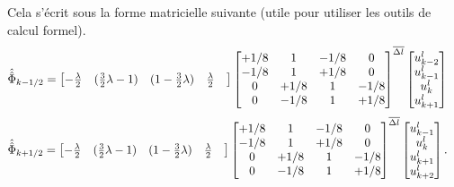             Cela s'écrit sous la forme matricielle suivante (utile pour utiliser les outils de calcul formel).
            \begin{align}
                \hat{\hat{\Phi}}_{k-1/2}
                    &=
                \begin{bmatrix}
                    -\frac{\lambda}{2}&
                    (\frac{3}{2} \lambda - 1)&
                    (1 - \frac{3}{2} \lambda)&
                    \frac{\lambda}{2}&
                \end{bmatrix}
                \begin{bmatrix}
                    +1/8 & 1 & -1/8 & 0\\
                    -1/8 & 1 & +1/8 & 0\\
                    0 & +1/8 & 1 & -1/8\\
                    0 & -1/8 & 1 & +1/8\\
                \end{bmatrix}^{\overline{\Delta l}}
                \begin{bmatrix}
                    u^l_{k-2}\\
                    u^l_{k-1}\\
                    u^l_{k}\\
                    u^l_{k+1}\\
                \end{bmatrix}
            \end{align}
            \begin{align}
                \hat{\hat{\Phi}}_{k+1/2}
                    &=
                \begin{bmatrix}
                    -\frac{\lambda}{2}&
                    (\frac{3}{2} \lambda - 1)&
                    (1 - \frac{3}{2} \lambda)&
                    \frac{\lambda}{2}&
                \end{bmatrix}
                \begin{bmatrix}
                    +1/8 & 1 & -1/8 & 0\\
                    -1/8 & 1 & +1/8 & 0\\
                    0 & +1/8 & 1 & -1/8\\
                    0 & -1/8 & 1 & +1/8\\
                \end{bmatrix}^{\overline{\Delta l}}
                \begin{bmatrix}
                    u^l_{k-1}\\
                    u^l_{k}\\
                    u^l_{k+1}\\
                    u^l_{k+2}\\
                \end{bmatrix}.
            \end{align}

